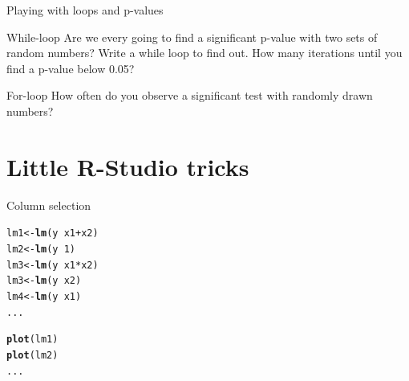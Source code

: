 \documentclass[10pt]{beamer}\usepackage[]{graphicx}\usepackage[]{color}
\makeatletter
\newcommand{\hlnum}[1]{\textcolor[rgb]{0.686,0.059,0.569}{#1}}%
\newcommand{\hlopt}[1]{\textcolor[rgb]{0,0,0}{#1}}%
\newcommand{\hlstd}[1]{\textcolor[rgb]{0.345,0.345,0.345}{#1}}%
\newcommand{\hlkwb}[1]{\textcolor[rgb]{0.69,0.353,0.396}{#1}}%
\newcommand{\hlkwd}[1]{\textcolor[rgb]{0.737,0.353,0.396}{\textbf{#1}}}%
\newenvironment{kframe}{%
 \def\at@end@of@kframe{}%
 \ifinner\ifhmode%
  \def\at@end@of@kframe{\end{minipage}}%
  \begin{minipage}{\columnwidth}%
 \fi\fi%
 \def\FrameCommand##1{\hskip\@totalleftmargin \hskip-\fboxsep
 \colorbox{shadecolor}{##1}\hskip-\fboxsep
     \hskip-\linewidth \hskip-\@totalleftmargin \hskip\columnwidth}%
 \MakeFramed {\advance\hsize-\width
   \@totalleftmargin\z@ \linewidth\hsize
   \@setminipage}}%
 {\par\unskip\endMakeFramed%
 \at@end@of@kframe}
\newenvironment{knitrout}{}{} %
\makeatother
\begin{document}
\begin{frame}[fragile]{Playing with loops and p-values}

\begin{alertblock}{While-loop}
Are we every going to find a significant p-value with two sets of random numbers? Write a while loop to find out. How many iterations until you find a p-value below 0.05?

\end{alertblock}

\begin{alertblock}{For-loop}
How often do you observe a significant test with randomly drawn numbers?

\end{alertblock}

\end{frame}



\section{Little R-Studio tricks}

\begin{frame}[fragile]{Column selection}

\begin{knitrout}
\color{fgcolor}\begin{kframe}
\begin{alltt}
\hlstd{lm1}   \hlkwb{<-} \hlkwd{lm}\hlstd{(y} \hlopt{~} \hlstd{x1} \hlopt{+} \hlstd{x2)}
\hlstd{lm2}   \hlkwb{<-} \hlkwd{lm}\hlstd{(y} \hlopt{~} \hlnum{1}\hlstd{)}
\hlstd{lm3}   \hlkwb{<-} \hlkwd{lm}\hlstd{(y} \hlopt{~} \hlstd{x1}\hlopt{*}\hlstd{x2)}
\hlstd{lm3}   \hlkwb{<-} \hlkwd{lm}\hlstd{(y} \hlopt{~} \hlstd{x2)}
\hlstd{lm4}   \hlkwb{<-} \hlkwd{lm}\hlstd{(y} \hlopt{~} \hlstd{x1)}
\hlstd{...}

\hlkwd{plot}\hlstd{(lm1)}
\hlkwd{plot}\hlstd{(lm2)}
\hlstd{...}
\end{alltt}
\end{kframe}
\end{knitrout}

\end{frame}
\end{document}
